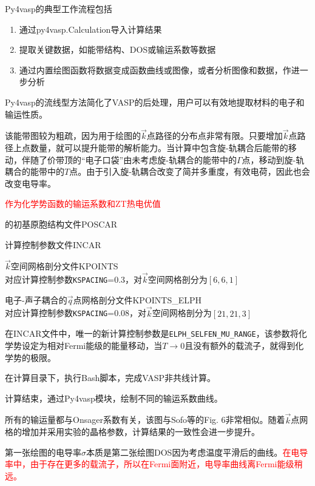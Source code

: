 \textrm{Py4vasp}的典型工作流程包括
\begin{enumerate}
	\item 通过\textrm{py4vasp.Calculation}导入计算结果
	\item 提取关键数据，如能带结构、\textrm{DOS}或输运系数等数据
	\item 通过内置绘图函数将数据变成函数曲线或图像，或者分析图像和数据，作进一步分析
\end{enumerate}
\textrm{Py4vasp}的流线型方法简化了\textrm{VASP}的后处理，用户可以有效地提取材料的电子和输运性质。

该能带图较为粗疏，因为用于绘图的$\vec k$点路径的分布点非常有限。只要增加$\vec k$点路径上点数量，就可以提升能带的解析能力。当计算中包含旋-轨耦合后能带的移动，伴随了价带顶的``电子口袋''由未考虑旋-轨耦合的能带中的$\Gamma$点，移动到旋-轨耦合的能带中的$T$点。由于引入旋-轨耦合改变了简并多重度，有效电荷，因此也会改变电导率。

\textcolor{red}{作为化学势函数的输运系数和\rm{ZT}热电优值}

的初基原胞结构文件\textrm{POSCAR}

计算控制参数文件\textrm{INCAR}

$\vec k$空间网格剖分文件\textrm{KPOINTS}\\
对应计算控制参数\texttt{KSPACING}=0.3，对$\vec k$空间网格剖分为$[6,6,1]$

电子-声子耦合的$\vec q$点网格剖分文件\textrm{KPOINTS\_ELPH}\\
对应计算控制参数\texttt{KSPACING}=0.08，对$\vec k$空间网格剖分为$[21,21,3]$

在\textrm{INCAR}文件中，唯一的新计算控制参数是\texttt{ELPH\_SELFEN\_MU\_RANGE}，该参数将化学势设定为相对\textrm{Fermi}能级的能量移动，当$T\rightarrow0$且没有额外的载流子，就得到化学势的极限。

在计算目录下，执行\textrm{Bash}脚本，完成\textrm{VASP}非共线计算。

计算结束，通过\textrm{Py4vasp}模块，绘制不同的输运系数曲线。

所有的输运量都与\textrm{Onsager}系数有关，该图与\textrm{Sofo}等的\textrm{Fig. 6}非常相似。随着$\vec k$点网格的增加并采用实验的晶格参数，计算结果的一致性会进一步提升。

第一张绘图的电导率$\sigma$本质是第二张绘图\textrm{DOS}因为考虑温度平滑后的曲线。\textcolor{red}{在电导率中，由于存在更多的载流子，所以在\textrm{Fermi}面附近，电导率曲线离\textrm{Fermi}能级稍远。}

